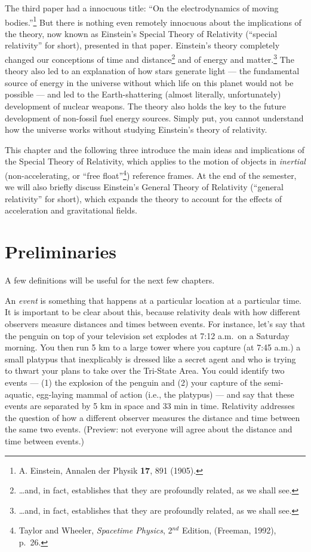 The third paper had a innocuous title: ``On the electrodynamics of
moving bodies.''\footnote{A. Einstein, Annalen der Physik \textbf{17},
  891 (1905).} But there is nothing even remotely innocuous about the
implications of the theory, now known as Einstein's Special Theory of
Relativity (``special relativity'' for short), presented in that
paper.  Einstein's theory completely changed our conceptions of time
and distance\footnote{\dots and, in fact, establishes that they are
  profoundly related, as we shall see.} and of energy and
matter.\footnote{\dots and, in fact, establishes that they are
  profoundly related, as we shall see.}  The theory also led to an
explanation of how stars generate light --- the fundamental source of
energy in the universe without which life on this planet would not be
possible --- and led to the Earth-shattering (almost literally,
unfortunately) development of nuclear weapons.  The theory also holds
the key to the future development of non-fossil fuel energy sources.
Simply put, you cannot understand how the universe works without
studying Einstein's theory of relativity.
   
This chapter and the following three introduce the main ideas and
implications of the Special Theory of Relativity, which applies to the
motion of objects in \emph{inertial} (non-accelerating, or ``free
float''\footnote{Taylor and Wheeler, \textit{Spacetime Physics}, 2$^{
    nd}$ Edition, (Freeman, 1992), p.\ 26.})  reference frames.  At the
end of the semester, we will also briefly discuss Einstein's General
Theory of Relativity (``general relativity'' for short), which expands
the theory to account for the effects of acceleration and
gravitational fields.

\section{Preliminaries}
A few definitions will be useful for the next few chapters.
   
An \emph{event} is something that happens at a particular
location at a particular time.  It is important to be clear about
this, because relativity deals with how different observers measure
distances and times between events.  For instance, let's say that the
penguin on top of your television set explodes at 7:12 a.m.\ on a
Saturday morning.  You then run 5 km to a large tower where you
capture (at 7:45 a.m.) a small platypus that inexplicably is dressed like a
secret agent and who is trying to thwart your plans to take over
the Tri-State Area.  You could identify two events --- (1) the
explosion of the penguin and (2) your capture of the semi-aquatic,
egg-laying mammal of action (i.e., the platypus) --- and say
that these events are separated by 5 km in space and 33 min in time.
Relativity addresses the question of how a different observer measures
the distance and time between the same two events.  (Preview: not
everyone will agree about the distance and time between events.)
   

